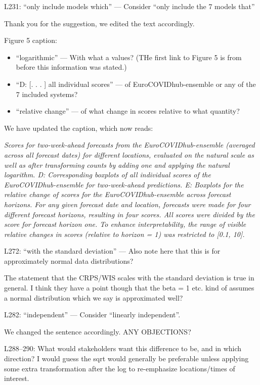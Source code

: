 \documentclass{article}
\newcommand{\red}{\color{red}}
\newcommand{\black}{\color{black}}
\newcommand{\blue}{\color{blue}}
\begin{document}
\blue
L231: “only include models which” — Consider “only include the 7 models that”

\black
Thank you for the suggestion, we edited the text accordingly. 

\blue
Figure 5 caption:
\begin{itemize}
    \item “logarithmic” — With what a values? (THe first link to Figure 5 is from before this information was stated.)
    \item “D: [. . . ] all individual scores” — of EuroCOVIDhub-ensemble or any of the 7 included systems?
    \item “relative change” — of what change in scores relative to what quantity?
\end{itemize}

\black
We have updated the caption, which now reads: 

\textit{Scores for two-week-ahead forecasts from the EuroCOVIDhub-ensemble (averaged across all forecast dates) for different locations, evaluated on the natural scale as well as after transforming counts by adding one and applying the natural logarithm. D: Corresponding boxplots of all individual scores of the EuroCOVIDhub-ensemble for two-week-ahead predictions. E: Boxplots for the relative change of scores for the EuroCOVIDhub-ensemble across forecast horizons. For any given forecast date and location, forecasts were made for four different forecast horizons, resulting in four scores. All scores were divided by the score for forecast horizon one. To enhance interpretability, the range of visible relative changes in scores (relative to horizon = 1) was restricted to [0.1, 10].}

\red

L272: “with the standard deviation” — Also note here that this is for approximately normal data distributions?

\black 
The statement that the CRPS/WIS scales with the standard deviation is true in general. I think they have a point though that the beta = 1 etc. kind of assumes a normal distribution which we say is approximated well? 

\blue
L282: “independent” — Consider “linearly independent”.

\black
We changed the sentence accordingly. ANY OBJECTIONS? 

\black

\red
L288–290: What would stakeholders want this difference to be, and in
which direction? I would guess the sqrt would generally be preferable unless applying some extra transformation after the log to re-emphasize locations/times of interest.
\end{document}
